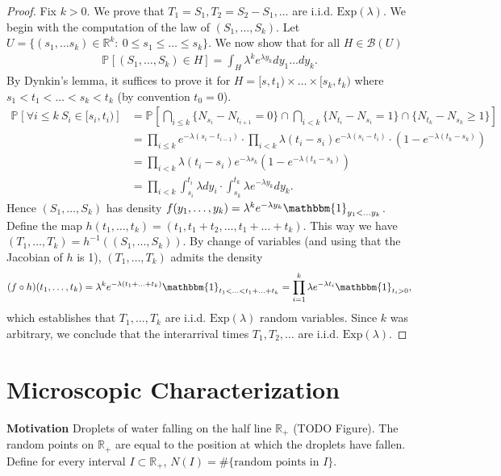 \begin{proof}
Fix $k> 0$. We prove that $T_1=S_1, T_2 =S_2-S_1,\ldots$ are i.i.d. $ \textrm{Exp} (\lambda )$. We begin with the computation of the law of $(S_1,\ldots,S_k)$. Let $U = \{ (s_1, \ldots s_k)\in \mathbb{R}^{k}:\ 0 \leq s_1 \leq \ldots \leq s_k \}$. We now show that for all $H \in \mathcal{B}(U)$
\begin{align}
	\mathbb{P}_{} \left[ (S_1, \ldots, S_k ) \in H \right] = \int_{H}^{} \lambda^{k}e^{\lambda y_k}dy_1 \ldots dy_{k}.	
\end{align}
By Dynkin's lemma, it suffices to prove it for $H=[s,t_1) \times \ldots \times [s_k,t_k)$ where $s_1<t_1 < \ldots <s_k<t_k$ (by convention $t_0=0$).
\begin{align}
	\mathbb{P}_{} \left[ \forall i \leq k \ S_i \in [s_i,t_i) \right] 
	&= \mathbb{P}_{} \left[ \bigcap_{i\leq k}\{N_{s_i}-N_{t_{i+1}}=0 \} \cap \bigcap_{i<k}\{ N_{t_i} - N_{s_i} =1 \} \cap \{N_{t_k} - N_{s_k} \geq 1 \} \right] \\
	&= \prod_{i\leq k} e^{-\lambda (s_i - t_{i-1})} \cdot \prod_{i<k}\lambda(t_i - s_i) e^{-\lambda(s_i - t_i)} \cdot \left(1 - e^{-\lambda (t_k -s_k)}\right) \\
	&= \prod_{i<k}\lambda (t_i - s_i) e^{-\lambda s_k}\left(1-e^{-\lambda(t_k -s_k)}\right) \\
	&= \prod_{i<k}\int_{s_i}^{t_i} \lambda dy_i \cdot \int_{s_k}^{t_k} \lambda e^{-\lambda y_k}dy_k.
\end{align}
Hence $(S_1,\ldots,S_k)$ has density $f(y_1,\ldots,y_k)=\lambda^{k}e^{-\lambda y_k}\mathbbm{1}_{y_1 < \ldots y_k} $. Define the map $h(t_1,\ldots ,t_k) = (t_1, t_1+t_2,\ldots, t_1 + \ldots + t_k)$. This way we have $(T_1, \ldots , T_k)= h^{-1}((S_1, \ldots ,S_k))$. By change of variables (and using that the Jacobian of $h$ is 1), $(T_1, \ldots , T_k)$ admits the density
\begin{align}
	(f \circ h) (t_1, \ldots ,t_k) = \lambda^{k}e^{-\lambda(t_1+\ldots +t_k)} \mathbbm{1}_{t_1 < \ldots < t_1 +\ldots +t_k} = \prod_{i=1}^{k}\lambda e^{- \lambda t_i}\mathbbm{1}_{t_i>0} ,	
\end{align}
which establishes that $T_1,\ldots ,T_k$ are i.i.d. $ \textrm{Exp} (\lambda )$ random variables. Since $k$ was arbitrary, we conclude that the interarrival times $T_1, T_2, \ldots$ are i.i.d. $ \textrm{Exp} (\lambda)$.
\end{proof}

\section{Microscopic Characterization}
\noindent \textbf{Motivation} Droplets of water falling on the half line $\mathbb{R}_+$ {\color{blue}(TODO Figure)}. The random points on $\mathbb{R}_+$ are equal to the position at which the droplets have fallen. Define for every interval $I\subset \mathbb{R}_+$, $N(I)=\#\{ \textrm{random points in } I\}$. 

